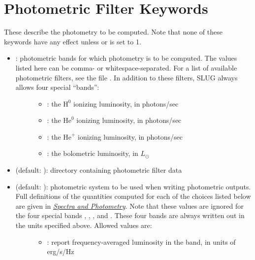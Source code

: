 \documentclass[letterpaper,10pt,english]{sphinxmanual}
\begin{document}
\section{Photometric Filter Keywords}
\label{parameters:ssec-phot-keywords}\label{parameters:photometric-filter-keywords}
These describe the photometry to be computed. Note that none of these keywords have any effect unless  or  is set to 1.
\begin{itemize}
\item {} \begin{description}
\item[{: photometric bands for which photometry is to be computed. The values listed here can be comma- or whitespace-separated. For a list of available photometric filters, see the file . In addition to these filters, SLUG always allows four special ``bands'':}] \leavevmode\begin{itemize}
\item {} 
: the \(\mathrm{H}^0\) ionizing luminosity, in photons/sec

\item {} 
: the \(\mathrm{He}^0\) ionizing luminosity, in photons/sec

\item {} 
: the \(\mathrm{He}^+\) ionizing luminosity, in photons/sec

\item {} 
: the bolometric luminosity, in \(L_\odot\)

\end{itemize}

\end{description}

\item {} 
 (default: ): directory containing photometric filter data

\item {} \begin{description}
\item[{ (default: ): photometric system to be used when writing photometric outputs. Full definitions of the quantities computed for each of the choices listed below are given in {\hyperref[intro:ssec-spec-phot]{\emph{Spectra and Photometry}}}. Note that these values are ignored for the four special bands , , , and . These four bands are always written out in the units specified above. Allowed values are:}] \leavevmode\begin{itemize}
\item {} 
: report frequency-averaged luminosity in the band, in units of erg/s/Hz


\end{itemize}
\end{description}
\end{itemize}
\end{document}
